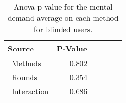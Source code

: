 
\begin{table}[!htb]
\centering
\caption{Anova p-value for the mental demand average on each method for blinded users.}
\label{tab:blocanova_gsr_two_way_sight}
\begin{tabular}{lrrrrl}
\toprule
          Source & P-Value \\
\midrule
    \    Methods &   0.802 \\
     \    Rounds &   0.354 \\
\    Interaction &   0.686 \\
\bottomrule
\end{tabular}
\end{table}

